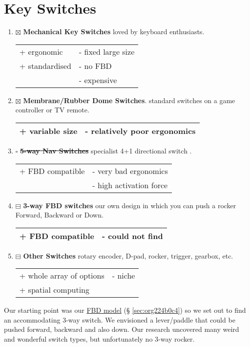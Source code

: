\documentclass[logo,bsc,singlespacing,parskip]{infthesis}
\begin{document}
\section{Key Switches}
\label{sec:org0cdfb00}
\begin{enumerate}
\item{$\boxtimes$} \textbf{Mechanical Key Switches} loved by keyboard enthusiasts.
\begin{longtable}{|p{6.25cm}|p{6.25cm}|}
\hline
+ ergonomic & - fixed large size\\
+ standardised & - no FBD\\
 & - expensive\\
\hline
\end{longtable}
\item{$\boxtimes$} \textbf{Membrane/Rubber Dome Switches}. standard switches on a game controller or TV remote.
\begin{longtable}{|p{6.25cm}|p{6.25cm}|}
\hline
+ variable size & - relatively poor ergonomics\\
\hline
\end{longtable}
\item{$\square$} \sout{\textbf{5-way Nav Switches}} specialist 4+1 directional switch \autocite{Thruhole5wayNavigation}.
\begin{longtable}{|p{6.25cm}|p{6.25cm}|}
\hline
+ FBD compatible & - very bad ergonomics\\
 & - high activation force\\
\hline
\end{longtable}
\item{$\boxminus$} \textbf{3-way FBD switches} our own design in which you can push a rocker Forward, Backward or Down.
\begin{longtable}{|p{6.25cm}|p{6.25cm}|}
\hline
+ FBD compatible & - could not find\\
\hline
\end{longtable}
\item{$\boxminus$} \textbf{Other Switches} rotary encoder, D-pad, rocker, trigger, gearbox, etc.
\begin{longtable}{|p{6.25cm}|p{6.25cm}|}
\hline
+ whole array of options & - niche\\
+ spatial computing & \\
\hline
\end{longtable}
\end{enumerate}

Our starting point was our \hyperref[sec:org224b0c4]{FBD model} (§ \ref{sec:org224b0c4}) so we set out to find an accommodating 3-way switch.
We envisioned a lever/paddle that could be pushed forward, backward and also down.
Our research uncovered many weird and wonderful switch types, but unfortunately no 3-way rocker.
\end{document}
